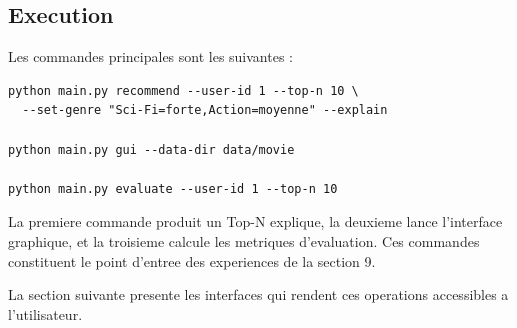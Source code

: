 \subsection{Execution}

Les commandes principales sont les suivantes :
\begin{verbatim}
python main.py recommend --user-id 1 --top-n 10 \
  --set-genre "Sci-Fi=forte,Action=moyenne" --explain

python main.py gui --data-dir data/movie

python main.py evaluate --user-id 1 --top-n 10
\end{verbatim}

La premiere commande produit un Top-N explique, la deuxieme lance l'interface graphique, et la troisieme calcule les metriques d'evaluation. Ces commandes constituent le point d'entree des experiences de la section 9.

La section suivante presente les interfaces qui rendent ces operations accessibles a l'utilisateur.

